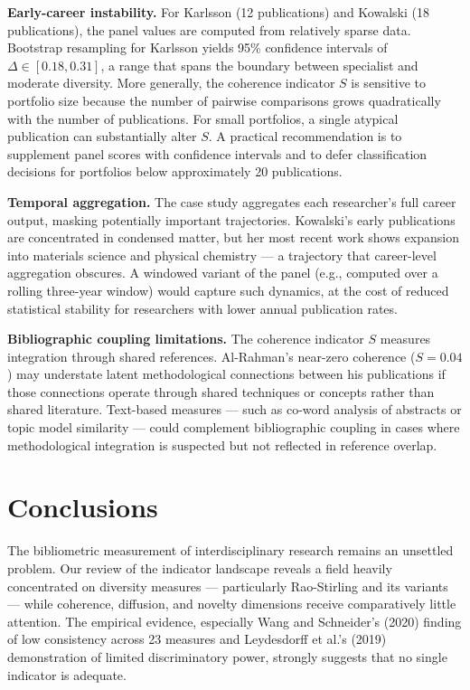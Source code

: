\documentclass[
]{article}
\begin{document}
\textbf{Early-career instability.} For Karlsson (12 publications) and
Kowalski (18 publications), the panel values are computed from
relatively sparse data. Bootstrap resampling for Karlsson yields 95\%
confidence intervals of \(\Delta \in [0.18, 0.31]\), a range that spans
the boundary between specialist and moderate diversity. More generally,
the coherence indicator \(S\) is sensitive to portfolio size because the
number of pairwise comparisons grows quadratically with the number of
publications. For small portfolios, a single atypical publication can
substantially alter \(S\). A practical recommendation is to supplement
panel scores with confidence intervals and to defer classification
decisions for portfolios below approximately 20 publications.

\textbf{Temporal aggregation.} The case study aggregates each
researcher's full career output, masking potentially important
trajectories. Kowalski's early publications are concentrated in
condensed matter, but her most recent work shows expansion into
materials science and physical chemistry --- a trajectory that
career-level aggregation obscures. A windowed variant of the panel
(e.g., computed over a rolling three-year window) would capture such
dynamics, at the cost of reduced statistical stability for researchers
with lower annual publication rates.

\textbf{Bibliographic coupling limitations.} The coherence indicator
\(S\) measures integration through shared references. Al-Rahman's
near-zero coherence (\(S = 0.04\)) may understate latent methodological
connections between his publications if those connections operate
through shared techniques or concepts rather than shared literature.
Text-based measures --- such as co-word analysis of abstracts or topic
model similarity --- could complement bibliographic coupling in cases
where methodological integration is suspected but not reflected in
reference overlap.

\hypertarget{conclusions}{%
\section{Conclusions}\label{conclusions}}

The bibliometric measurement of interdisciplinary research remains an
unsettled problem. Our review of the indicator landscape reveals a field
heavily concentrated on diversity measures --- particularly Rao-Stirling
and its variants --- while coherence, diffusion, and novelty dimensions
receive comparatively little attention. The empirical evidence,
especially Wang and Schneider's (2020) finding of low consistency across
23 measures and Leydesdorff et al.'s (2019) demonstration of limited
discriminatory power, strongly suggests that no single indicator is
adequate.
\end{document}
